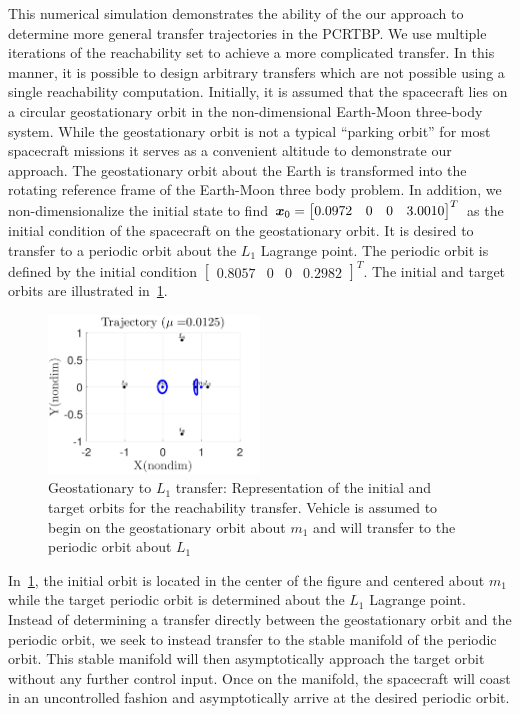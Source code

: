 \documentclass[smallcondensed]{svjour3}
\begin{document}
This numerical simulation demonstrates the ability of the our approach to determine more general transfer trajectories in the PCRTBP. 
We use multiple iterations of the reachability set to achieve a more complicated transfer.
In this manner, it is possible to design arbitrary transfers which are not possible using a single reachability computation.
Initially, it is assumed that the spacecraft lies on a circular geostationary orbit in the non-dimensional Earth-Moon three-body system. 
While the geostationary orbit is not a typical ``parking orbit'' for most spacecraft missions it serves as a convenient altitude to demonstrate our approach.
The geostationary orbit about the Earth is transformed into the rotating reference frame of the Earth-Moon three body problem.
In addition, we non-dimensionalize the initial state to find \( \bm{x}_0 = \begin{bmatrix} 0.0972 & 0 & 0 & 3.0010\end{bmatrix}^T\) as the initial condition of the spacecraft on the geostationary orbit.
It is desired to transfer to a periodic orbit about the \( L_1 \) Lagrange point. 
The periodic orbit is defined by the initial condition \(\begin{bmatrix} 0.8057 & 0 & 0 & 0.2982 \end{bmatrix}^T \).
The initial and target orbits are illustrated in~\cref{fig:geo_transfer_target}.
\begin{figure}[htbp]
   \centering
   \includegraphics[width=0.5\textwidth]{initial_final} %
   \caption{Geostationary to \( L_1 \) transfer: Representation of the initial and target orbits for the reachability transfer. 
   Vehicle is assumed to begin on the geostationary orbit about \( m_1\) and will transfer to the periodic orbit about \( L_1\)}
   \label{fig:geo_transfer_target}
\end{figure}
In~\cref{fig:geo_transfer_target}, the initial orbit is located in the center of the figure and centered about \( m_1 \) while the target periodic orbit is determined about the \( L_1 \) Lagrange point.
Instead of determining a transfer directly between the geostationary orbit and the periodic orbit, we seek to instead transfer to the stable manifold of the periodic orbit.
This stable manifold will then asymptotically approach the target orbit without any further control input.
Once on the manifold, the spacecraft will coast in an uncontrolled fashion and asymptotically arrive at the desired periodic orbit.
\end{document}
